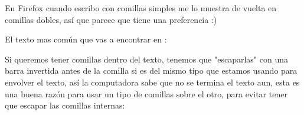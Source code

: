 \documentclass[letterpaper,10pt,spanish]{sphinxmanual}
\begin{document}
En Firefox cuando escribo con comillas simples me lo muestra de vuelta en
comillas dobles, así que parece que tiene una preferencia :)

%
\begin{sphinxVerbatim}[commandchars=\\\{\}]
\end{sphinxVerbatim}

%
\begin{sphinxVerbatim}[commandchars=\\\{\}]
 
\end{sphinxVerbatim}

El texto mas común que vas a encontrar en :

%
\begin{sphinxVerbatim}[commandchars=\\\{\}]
\end{sphinxVerbatim}

%
\begin{sphinxVerbatim}[commandchars=\\\{\}]
 
\end{sphinxVerbatim}

Si queremos tener comillas dentro del texto, tenemos que "escaparlas" con una
barra invertida antes de la comilla si es del mismo tipo que estamos usando
para envolver el texto, así la computadora sabe que no se termina el texto aun,
esta es una buena razón para usar un tipo de comillas sobre el otro, para evitar
tener que escapar las comillas internas:

%
\begin{sphinxVerbatim}[commandchars=\\\{\}]
\end{sphinxVerbatim}

%
\begin{sphinxVerbatim}[commandchars=\\\{\}]
 
\end{sphinxVerbatim}
\end{document}
